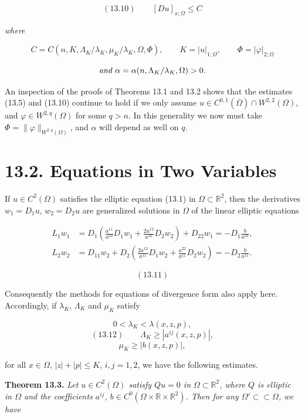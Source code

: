 \[
(13.10)\qquad [Du]_{x;\Omega} \leq C
\]

\emph{where}

\[
C = C(n, K, \Lambda_K/\lambda_K, \mu_K/\lambda_K, \Omega, \Phi),
\qquad K = |u|_{1;\Omega}, \qquad \Phi = |\varphi|_{2;\Omega}
\]

\[
\emph{and } \alpha = \alpha(n, \Lambda_K/\lambda_K, \Omega) > 0.
\]

An inspection of the proofs of Theorems 13.1 and 13.2 shows that the estimates (13.5) and (13.10) continue to hold if we only assume $u \in C^{0,1}(\overline{\Omega}) \cap W^{2,2}(\Omega)$, and $\varphi \in W^{2,q}(\Omega)$ for some $q>n$. In this generality we now must take $\Phi = \|\varphi\|_{W^{2,q}(\Omega)}$, and $\alpha$ will depend as well on $q$.

\section*{13.2. Equations in Two Variables}

If $u \in C^2(\Omega)$ satisfies the elliptic equation (13.1) in $\Omega \subset \mathbb{R}^2$, then the derivatives
$w_1 = D_1u$, $w_2 = D_2u$ are generalized solutions in $\Omega$ of the linear elliptic equations

\begin{align*}
L_1w_1 &= D_1\!\left(\frac{a^{11}}{a^{22}}D_1w_1 + \frac{2a^{12}}{a^{22}}D_2w_2\right) + D_{22}w_1 = -D_1\frac{b}{a^{22}}, \\
L_2w_2 &= D_{11}w_2 + D_2\!\left(\frac{2a^{12}}{a^{11}}D_1w_2 + \frac{a^{22}}{a^{11}}D_2w_2\right) = -D_2\frac{b}{a^{11}}.
\end{align*}

\[
(13.11)
\]

Consequently the methods for equations of divergence form also apply here. Accordingly, if $\lambda_K$, $\Lambda_K$ and $\mu_K$ satisfy

\[
0 < \lambda_K < \lambda(x,z,p),
\]
\[
(13.12)\qquad \Lambda_K \geq |a^{ij}(x,z,p)|,
\]
\[
\mu_K \geq |b(x,z,p)|,
\]

for all $x \in \Omega$, $|z|+|p| \leq K$, $i,j=1,2$, we have the following estimates.

\begin{theorem}\label{thm:gt13-holder-gradient-13-3}
\textbf{Theorem 13.3.} \emph{Let $u \in C^2(\Omega)$ satisfy $Qu=0$ in $\Omega \subset \mathbb{R}^2$, where $Q$ is elliptic in $\Omega$ and the coefficients $a^{ij}$, $b \in C^0(\Omega\times \mathbb{R}\times \mathbb{R}^2)$. Then for any $\Omega' \subset \subset \Omega$, we have}
\end{theorem}

